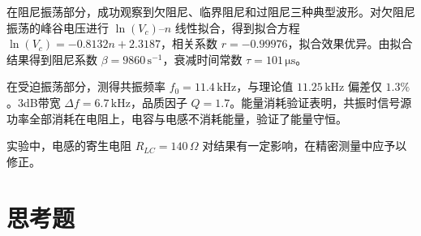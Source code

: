 \documentclass[UTF8]{article}
\begin{document}
在阻尼振荡部分，成功观察到欠阻尼、临界阻尼和过阻尼三种典型波形。对欠阻尼振荡的峰谷电压进行 $\ln(V_c)$--$n$ 线性拟合，得到拟合方程 $\ln(V_c) = -0.8132n + 2.3187$，相关系数 $r = -0.99976$，拟合效果优异。由拟合结果得到阻尼系数 $\beta = 9860\,\mathrm{s^{-1}}$，衰减时间常数 $\tau = 101\,\mathrm{\mu s}$。

在受迫振荡部分，测得共振频率 $f_0 = 11.4\,\mathrm{kHz}$，与理论值 $11.25\,\mathrm{kHz}$ 偏差仅 $1.3\%$。3dB带宽 $\Delta f = 6.7\,\mathrm{kHz}$，品质因子 $Q = 1.7$。能量消耗验证表明，共振时信号源功率全部消耗在电阻上，电容与电感不消耗能量，验证了能量守恒。

实验中，电感的寄生电阻 $R_{LC} = 140\,\Omega$ 对结果有一定影响，在精密测量中应予以修正。

\section{思考题}
\end{document}
